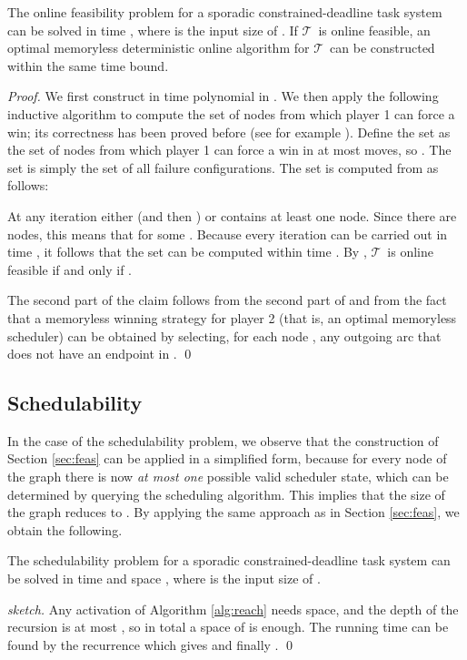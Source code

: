 \documentclass{llncs}
\newcommand{\tsys}{\ensuremath{\mathcal{T}}}
\begin{document}
\begin{theorem}
The online feasibility problem for a sporadic constrained-deadline task system  can be solved in time , where  is the input size of . If \tsys\ is online feasible, an optimal memoryless deterministic online algorithm for \tsys\ can be constructed within the same time bound. 
\end{theorem}
\begin{proof}
We first construct  in time polynomial in . We then apply the following inductive algorithm to compute the set of nodes  from which player 1 can force a win; its correctness has been proved before (see for example \cite[Proposition 2.18]{Graedel:2002}). Define the set  as the set of nodes from which player 1 can force a win in at most  moves, so . The set  is simply the set of all failure configurations. The set  is computed from  as follows: 

At any iteration either  (and then ) or  contains at least one node. Since there are  nodes, this means that  for some . Because every iteration can be carried out in time , it follows that the set  can be computed within time . By , \tsys\ is online feasible if and only if . 

The second part of the claim follows from the second part of  and from the fact that a memoryless winning strategy for player 2 (that is, an optimal memoryless scheduler) can be obtained by selecting, for each node , any outgoing arc that does not have an endpoint in .  
\qed
\end{proof}

\subsection{Schedulability}




In the case of the schedulability problem, we observe that the construction of Section \ref{sec:feas} can be applied in a simplified form, because for every node of the graph there is now \emph{at most one} possible valid scheduler state, which can be determined by querying the scheduling algorithm. 
This implies that the size of the graph reduces to . By applying the same approach as in Section \ref{sec:feas}, we obtain the following. 


\begin{theorem}
The schedulability problem for a sporadic constrained-deadline task system  can be solved in time  and space , where  is the input size of . 
\end{theorem}
\begin{proof}[sketch]
Any activation of Algorithm \ref{alg:reach} needs  space, and the depth of the recursion is at most , so in total a space of  is enough. The running time can be found by the recurrence  which gives  and finally . 
\qed
\end{proof}
\end{document}
